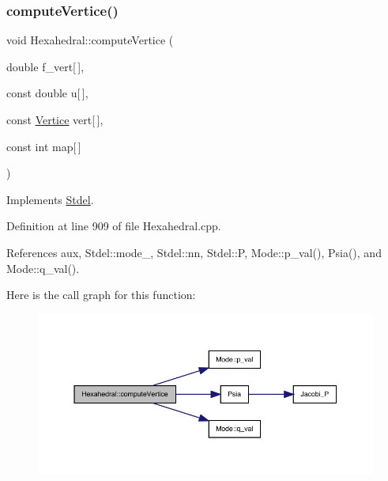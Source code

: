 \mbox{\label{classHexahedral_a55f51d6ec6006bde842a4f72260fbdba}} 
\subsubsection{\texorpdfstring{compute\+Vertice()}{computeVertice()}}
{\footnotesize\ttfamily void Hexahedral\+::compute\+Vertice (\begin{DoxyParamCaption}\item[{double}]{f\+\_\+vert\mbox{[}$\,$\mbox{]},  }\item[{const double}]{u\mbox{[}$\,$\mbox{]},  }\item[{const \hyperlink{structVertice}{Vertice}}]{vert\mbox{[}$\,$\mbox{]},  }\item[{const int}]{map\mbox{[}$\,$\mbox{]} }\end{DoxyParamCaption})\hspace{0.3cm}{\ttfamily [virtual]}}



Implements \hyperlink{classStdel_a74eed41f670878759c84e2014b4a2cd5}{Stdel}.



Definition at line 909 of file Hexahedral.\+cpp.



References aux, Stdel\+::mode\+\_\+, Stdel\+::nn, Stdel\+::P, Mode\+::p\+\_\+val(), Psia(), and Mode\+::q\+\_\+val().

Here is the call graph for this function\+:
\nopagebreak
\begin{figure}[H]
\begin{center}
\leavevmode
\includegraphics[width=350pt]{classHexahedral_a55f51d6ec6006bde842a4f72260fbdba_cgraph}
\end{center}
\end{figure}
\mbox{\label{classHexahedral_a86088799f63b981f6a350397d10e2efa}} 
